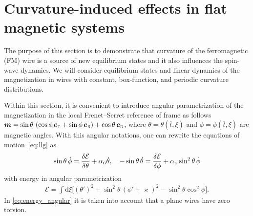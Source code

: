 \section{Curvature-induced effects in flat magnetic systems}\label{sec:curvature_effects}

The purpose of this section is to demonstrate that curvature of the ferromagnetic (FM) wire is a source of new equilibrium states and it also influences the spin-wave dynamics. We will consider equilibrium states and linear dynamics of the magnetization in wires with constant, box-function, and periodic curvature distributions.

Within this section, it is convenient to introduce angular parametrization of the magnetization in the local Frenet--Serret reference of frame as follows $\vec{m} =\sin\theta\,\left(\cos\phi\,\vec{e}_\textsc{t} + \sin\phi\,\vec{e}_\textsc{n}\right) + \cos\theta\,\vec{e}_\textsc{b}$, where $\theta=\theta(\overline{t},\xi)$ and $\phi=\phi(\overline{t},\xi)$ are magnetic angles. With this angular notations, one can rewrite the equations of motion~\eqref{eq:llg} as
\begin{equation}\label{eq:llg_angular}
\sin\theta\, \dot{\phi} = \frac{\delta \mathcal{E}}{\delta \theta}+\alpha_\textsc{g} \dot{\theta},\quad -\sin\theta\,\dot{\theta} = \frac{\delta \mathcal{E}}{\delta \phi}+\alpha_\textsc{g}\sin^2\theta\, \dot{\phi}
\end{equation}
with energy in angular parametrization
\begin{equation}\label{eq:energy_angular}
\begin{split}
\mathcal{E} = \int\mathrm{d}\xi\bigl[\left(\theta'\right)^2+\sin^2\theta\,\left(\phi'+\varkappa\right)^2-\sin^2\theta\cos^2\phi\bigr].
\end{split}
\end{equation}
In \eqref{eq:energy_angular} it is taken into account that a plane wires have zero torsion.







%

%